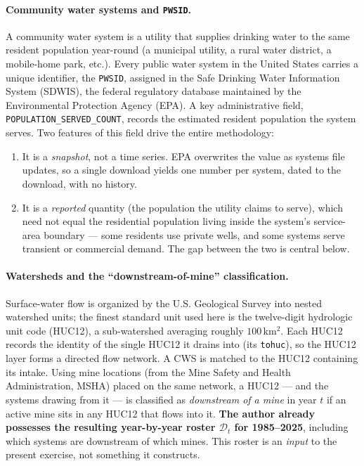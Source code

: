 \documentclass[11pt]{article}
\newcommand{\PWSID}{\texttt{PWSID}}
\begin{document}
\paragraph{Community water systems and \PWSID.}
A community water system is a utility that supplies drinking water to the same
resident population year-round (a municipal utility, a rural water district, a
mobile-home park, etc.). Every public water system in the United States carries a
unique identifier, the \PWSID, assigned in the Safe Drinking Water Information System
(SDWIS), the federal regulatory database maintained by the Environmental Protection
Agency (EPA). A key administrative field, \texttt{POPULATION\_SERVED\_COUNT}, records
the estimated resident population the system serves. Two features of this field drive
the entire methodology:
\begin{enumerate}[leftmargin=2em]
  \item It is a \emph{snapshot}, not a time series. EPA overwrites the value as
    systems file updates, so a single download yields one number per system, dated
    to the download, with no history.
  \item It is a \emph{reported} quantity (the population the utility claims to serve),
    which need not equal the residential population living inside the system's
    service-area boundary --- some residents use private wells, and some systems serve
    transient or commercial demand. The gap between the two is central below.
\end{enumerate}

\paragraph{Watersheds and the ``downstream-of-mine'' classification.}
Surface-water flow is organized by the U.S. Geological Survey into nested watershed
units; the finest standard unit used here is the twelve-digit hydrologic unit code
(HUC12), a sub-watershed averaging roughly $100$\,km$^2$. Each HUC12 records the
identity of the single HUC12 it drains into (its \texttt{tohuc}), so the HUC12 layer
forms a directed flow network. A CWS is matched to the HUC12 containing its intake.
Using mine locations (from the Mine Safety and Health Administration, MSHA) placed on
the same network, a HUC12 --- and the systems drawing from it --- is classified as
\emph{downstream of a mine} in year $t$ if an active mine sits in any HUC12 that flows
into it. \textbf{The author already possesses the resulting year-by-year roster
$\mathcal{D}_t$ for 1985--2025}, including which systems are downstream of which mines.
This roster is an \emph{input} to the present exercise, not something it constructs.
\end{document}
